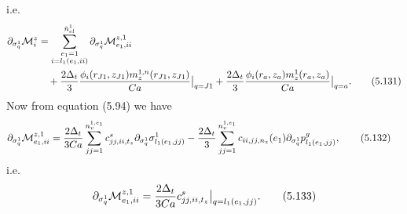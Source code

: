 \documentclass{article}
\begin{document}
i.e.
\begin{align}
\partial_{\sigma_q^1}\mathcal{M}_i^z &= \sum_{\substack{e_1=1\\ i=l_1(e_1,ii)}}^{\bar{n}_{el}^1} \partial_{\sigma_q^1} \mathcal{M}_{e_1,ii}^{z,1} \nonumber\\
&\quad + \frac{2\Delta_t}{3} \frac{\phi_i(r_{J1},z_{J1}) m_z^{1,n}(r_{J1},z_{J1})}{Ca} \big|_{q=J1} + \frac{2\Delta_t}{3} \frac{\phi_i(r_a,z_a) m_z^{1}(r_a,z_a)}{Ca} \big|_{q=a}. \tag{5.131}
\end{align}
Now from equation (5.94) we have
\begin{align}
\partial_{\sigma_q^1}\mathcal{M}_{e_1,ii}^{z,1} &= \frac{2\Delta_t}{3Ca} \sum_{jj=1}^{n_v^{1,e_1}} c_{jj,ii,t_z}^s \partial_{\sigma_q^1} \sigma_{l_1(e_1,jj)}^1 - \frac{2\Delta_t}{3} \sum_{jj=1}^{n_v^{1,e_1}} c_{ii,jj,n_z}(e_1) \partial_{\sigma_q^1} p_{l_1(e_1,jj)}^g, \tag{5.132}
\end{align}
i.e.
\begin{equation}
\partial_{\sigma_q^1}\mathcal{M}_{e_1,ii}^{z,1} = \frac{2\Delta_t}{3Ca} c_{jj,ii,t_z}^s \big|_{q=l_1(e_1,jj)}. \tag{5.133}
\end{equation}
\end{document}
